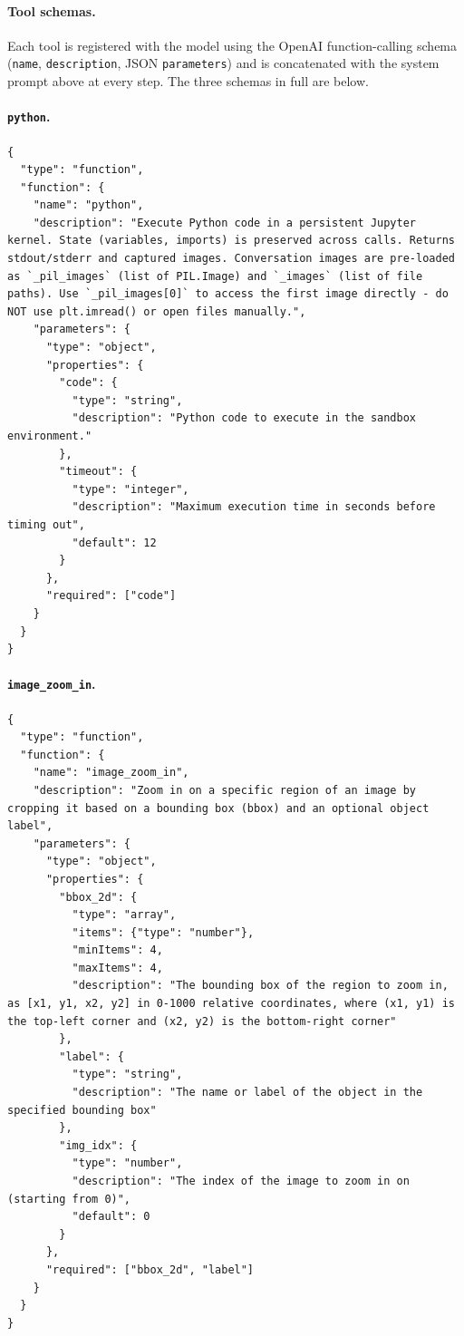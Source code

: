 \documentclass{llmxive}
\begin{document}
\paragraph{Tool schemas.}
Each tool is registered with the model using the OpenAI function-calling schema (\texttt{name}, \texttt{description}, JSON \texttt{parameters}) and is concatenated with the system prompt above at every step. The three schemas in full are below.

\paragraph{\texttt{python}.}
\begin{Verbatim}[fontsize=\small, breaklines=true, breakanywhere=true, breakindent=2em]
{
  "type": "function",
  "function": {
    "name": "python",
    "description": "Execute Python code in a persistent Jupyter kernel. State (variables, imports) is preserved across calls. Returns stdout/stderr and captured images. Conversation images are pre-loaded as `_pil_images` (list of PIL.Image) and `_images` (list of file paths). Use `_pil_images[0]` to access the first image directly - do NOT use plt.imread() or open files manually.",
    "parameters": {
      "type": "object",
      "properties": {
        "code": {
          "type": "string",
          "description": "Python code to execute in the sandbox environment."
        },
        "timeout": {
          "type": "integer",
          "description": "Maximum execution time in seconds before timing out",
          "default": 12
        }
      },
      "required": ["code"]
    }
  }
}
\end{Verbatim}

\paragraph{\texttt{image\_zoom\_in}.}
\begin{Verbatim}[fontsize=\small, breaklines=true, breakanywhere=true, breakindent=2em]
{
  "type": "function",
  "function": {
    "name": "image_zoom_in",
    "description": "Zoom in on a specific region of an image by cropping it based on a bounding box (bbox) and an optional object label",
    "parameters": {
      "type": "object",
      "properties": {
        "bbox_2d": {
          "type": "array",
          "items": {"type": "number"},
          "minItems": 4,
          "maxItems": 4,
          "description": "The bounding box of the region to zoom in, as [x1, y1, x2, y2] in 0-1000 relative coordinates, where (x1, y1) is the top-left corner and (x2, y2) is the bottom-right corner"
        },
        "label": {
          "type": "string",
          "description": "The name or label of the object in the specified bounding box"
        },
        "img_idx": {
          "type": "number",
          "description": "The index of the image to zoom in on (starting from 0)",
          "default": 0
        }
      },
      "required": ["bbox_2d", "label"]
    }
  }
}
\end{Verbatim}
\end{document}
